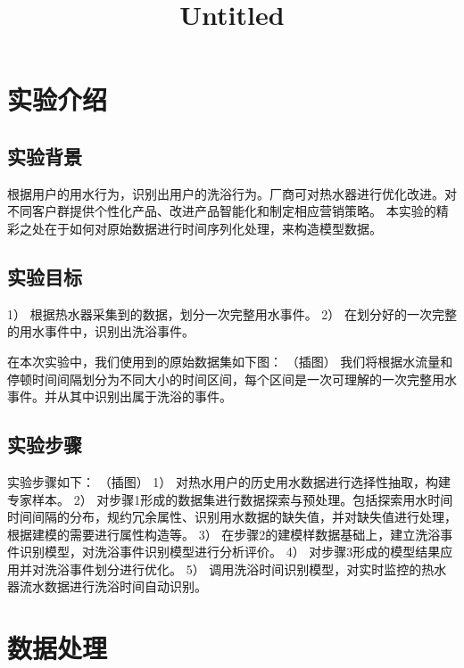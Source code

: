\documentclass[11pt]{article}
\title{Untitled}
\begin{document}
    
    
    \maketitle
    
    

    
    \section{实验介绍}\label{ux5b9eux9a8cux4ecbux7ecd}

\subsection{实验背景}\label{ux5b9eux9a8cux80ccux666f}

根据用户的用水行为，识别出用户的洗浴行为。厂商可对热水器进行优化改进。对不同客户群提供个性化产品、改进产品智能化和制定相应营销策略。
本实验的精彩之处在于如何对原始数据进行时间序列化处理，来构造模型数据。

\subsection{实验目标}\label{ux5b9eux9a8cux76eeux6807}

1） 根据热水器采集到的数据，划分一次完整用水事件。 2）
在划分好的一次完整的用水事件中，识别出洗浴事件。

在本次实验中，我们使用到的原始数据集如下图： （插图）
我们将根据水流量和停顿时间间隔划分为不同大小的时间区间，每个区间是一次可理解的一次完整用水事件。并从其中识别出属于洗浴的事件。

\subsection{实验步骤}\label{ux5b9eux9a8cux6b65ux9aa4}

实验步骤如下： （插图） 1）
对热水用户的历史用水数据进行选择性抽取，构建专家样本。 2）
对步骤1形成的数据集进行数据探索与预处理。包括探索用水时间时间间隔的分布，规约冗余属性、识别用水数据的缺失值，并对缺失值进行处理，根据建模的需要进行属性构造等。
3）
在步骤2的建模样数据基础上，建立洗浴事件识别模型，对洗浴事件识别模型进行分析评价。
4） 对步骤3形成的模型结果应用并对洗浴事件划分进行优化。 5）
调用洗浴时间识别模型，对实时监控的热水器流水数据进行洗浴时间自动识别。

\section{数据处理}\label{ux6570ux636eux5904ux7406}
\end{document}
